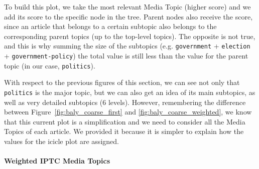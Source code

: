 To build this plot, we take the most relevant Media Topic (higher score) and we add its score to the specific node in the tree. Parent nodes also receive the score, since an article that belongs to a certain subtopic also belongs to the corresponding parent topics (up to the top-level topics). The opposite is not true, and this is why summing the size of the subtopics (e.g. \texttt{government} + \texttt{election} + \texttt{government-policy}) the total value is still less than the value for the parent topic (in our case, \texttt{politics}).


With respect to the previous figures of this section, we can see not only that \texttt{politics} is the major topic, but we can also get an idea of its main subtopics, as well as very detailed subtopics (6 levels).
However, remembering the difference between Figure~\ref{fig:baly_coarse_first} and \ref{fig:baly_coarse_weighted}, we know that this current plot is a simplification and we need to consider all the Media Topics of each article.
We provided it because it is simpler to explain how the values for the icicle plot are assigned.




\paragraph{Weighted IPTC Media Topics}

